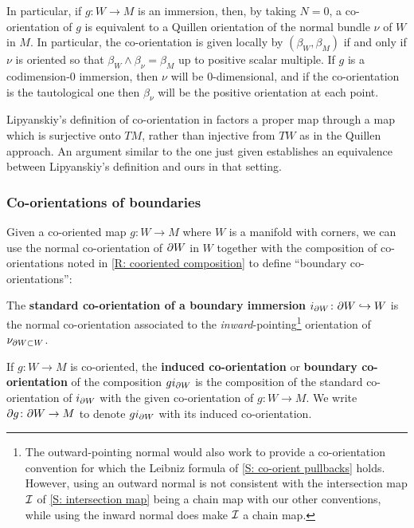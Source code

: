 \begin{remark}\label{R: immersion}
	In particular, if $g \colon W \to M$ is an immersion, then, by taking $N = 0$, a co-orientation of $g$ is equivalent to a Quillen orientation of the normal bundle $\nu$ of $W$ in $M$.
	In particular, the co-orientation is given locally by $(\beta_W, \beta_M)$ if and only if $\nu$ is oriented so that $\beta_W \wedge \beta_\nu = \beta_M$ up to positive scalar multiple.
	If $g$ is a codimension-$0$ immersion, then $\nu$ will be $0$-dimensional, and if the co-orientation is the tautological one then $\beta_\nu$ will be the positive orientation at each point.
\end{remark}

\begin{remark}
	Lipyanskiy's definition of co-orientation in \cite{Lipy14} factors a proper map through a map which is surjective onto $TM$, rather than injective from $TW$ as in the Quillen approach.
	An argument similar to the one just given establishes an equivalence between Lipyanskiy's definition and ours in that setting.
\end{remark}

\subsubsection{Co-orientations of boundaries}

Given a co-oriented map $g \colon W \to M$ where $W$ is a manifold with corners, we can use the normal co-orientation of $\partial W$ in $W$ together with the composition of co-orientations noted in \cref{R: cooriented composition} to define ``boundary co-orientations'':

\begin{definition}\label{D: boundary co-orientation}
	The \textbf{standard co-orientation of a boundary immersion} $i_{\partial W} \colon \partial W \hookrightarrow W$ is the normal co-orientation associated to the \textit{inward}-pointing\footnote{The outward-pointing normal would also work to provide a co-orientation convention for which the Leibniz formula of \cref{S: co-orient pullbacks} holds.
	However, using an outward normal is not consistent with the intersection map $\mathcal{I}$ of \cref{S: intersection map} being a chain map with our other conventions, while using the inward normal does make $\mathcal{I}$ a chain map.} orientation of $\nu_{\partial W \subset W}$.

	If $g \colon W \to M$ is co-oriented, the \textbf{induced co-orientation} or \textbf{boundary co-orientation} of the composition $gi_{\partial W}$ is the composition of the standard co-orientation of $i_{\partial W}$ with the given co-orientation of $g \colon W \to M$.
	We write $\partial g \colon \partial W \to M$ to denote $gi_{\partial W}$ with its induced co-orientation.
\end{definition}

